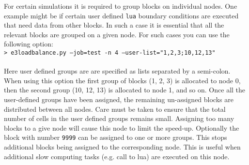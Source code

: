 For certain simulations it is required to group blocks on individual nodes.
One example might be if certain user defined \texttt{lua} boundary conditions are executed that need data from other blocks. 
In such a case it is essential that all the relevant blocks are grouped on a given node. 
For such cases you can use the following option:\\
%
\topbar
\texttt{> e3loadbalance.py --job=test -n 4 --user-list="1,2,3;10,12,13"}\\
\bottombar\\
%
Here user defined groups are are specified as lists separated by a semi-colon. 
When using this option the first group of blocks (1, 2, 3) is allocated to node 0, then the second group (10, 12, 13) is allocated to node 1, and so on. 
Once all the user-defined groups have been assigned, the remaining un-assigned blocks are distributed between all nodes.
Care must be taken to ensure that the total number of cells in the user defined groups remains small.
Assigning too many blocks to a give node will cause this node to limit the speed-up. 
Optionally the block with number \texttt{9999} can be assigned to one or more groups. 
This stops additional blocks being assigned to the corresponding node. 
This is useful when additional slow computing tasks (e.g. call to lua) are executed on this node.


